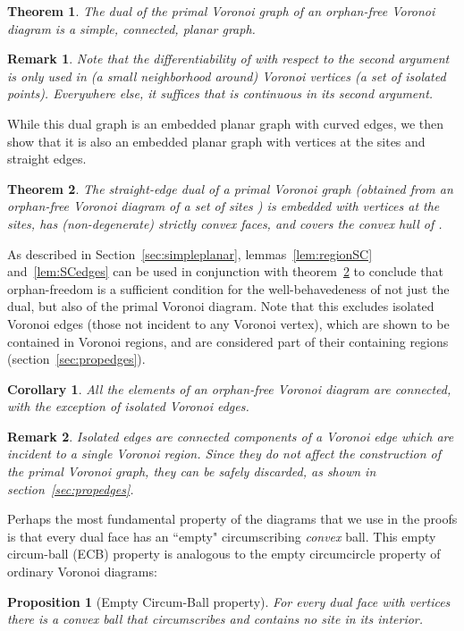 \documentclass[11pt]{article}
\newtheorem{theorem}{Theorem}
\newtheorem{proposition}{Proposition}
\newtheorem{remark}{Remark}
\newtheorem{corollary}{Corollary}
\begin{document}
\begin{theorem}\label{th:simpleplanar}
The dual of the primal Voronoi graph of an orphan-free Voronoi diagram 
	is a simple, connected, planar graph. 
\end{theorem}

\begin{remark}
Note that the differentiability of  with respect to the second argument is only used in (a small neighborhood around) Voronoi vertices 
	(a set of isolated points). 
Everywhere else, it suffices that  is continuous in its second argument. 
\end{remark}


While this dual graph is an embedded planar graph with curved edges, we then show
	that it is also an embedded planar graph with vertices at the sites and straight edges. 



\begin{theorem}\label{th:main}
	The straight-edge dual of a primal Voronoi graph
	(obtained from an orphan-free Voronoi diagram of a set of sites )
is embedded with vertices at the sites, 
		has (non-degenerate) strictly convex faces, and covers the convex hull of . 
\end{theorem}


As described in Section~\ref{sec:simpleplanar}, lemmas~\ref{lem:regionSC} and~\ref{lem:SCedges} 
	can be used in conjunction with theorem~\ref{th:main} to 
	conclude that orphan-freedom 
	is a sufficient condition 
	for the well-behavedeness of not just the 
dual, but also of the primal Voronoi diagram. 
Note that this excludes isolated Voronoi edges (those not incident to any Voronoi vertex), 
	which are shown to be contained in Voronoi regions, 
	and are considered part of their containing regions (section~\ref{sec:propedges}). 


\begin{corollary}\label{cor:VorI}
	All the elements of an orphan-free Voronoi diagram are connected, 
	with the exception of isolated Voronoi edges. 
\end{corollary}
\begin{remark}
	Isolated edges are connected components of a Voronoi edge 
	which are incident to a single Voronoi region. 
	Since they do not affect the construction of the primal Voronoi graph, 
they can be safely discarded, as shown in section~\ref{sec:propedges}.
\end{remark}

Perhaps the most fundamental property of the diagrams that we use in the proofs is that 
	every dual face has an ``empty" circumscribing \emph{convex} ball. 
This empty circum-ball (ECB) property
	is analogous to the empty circumcircle property of ordinary Voronoi diagrams:
\begin{proposition}[Empty Circum-Ball property]\label{prop:ECB}
	For every dual face with vertices  there is a convex ball that circumscribes  and contains no site in its interior. 
\end{proposition}
\end{document}
